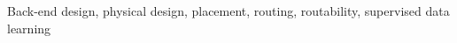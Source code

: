 \documentclass[conference]{IEEEtran}
\begin{document}
\begin{IEEEkeywords}
Back-end design, physical design, placement, routing, routability, supervised data learning
\end{IEEEkeywords}










\end{document}
